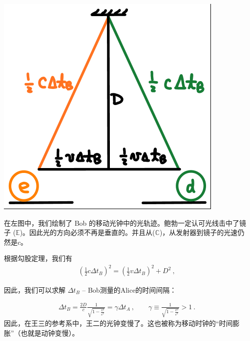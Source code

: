 {	\begin{minipage}
		{0.35\textwidth}
		\includegraphics[width=\textwidth, trim={0 2pt 2pt 0}, clip]{light_clock_B1}
	\end{minipage}
	\hspace{0.05\textwidth}
	\begin{minipage}
		{0.6\textwidth}
		在左图中，我们绘制了 Bob 的移动光钟中的光轨迹。鲍勃一定认可光线击中了镜子 ($\mathbb{E}$)。因此光的方向必须不再是垂直的。并且从($\mathbb{C}$)，从发射器到镜子的光速仍然是$c$。

		
		根据勾股定理，我们有
		\begin{align}
			\label{eq:lcb}
			\left ( \frac{1}{2} c \Delta t_B \right )^2 = \left ( \frac{1}{2} v \Delta t_B \right )^2 + D^2 ~,
		\end{align}
	\end{minipage}

	\bigskip

	\tcblower
	
	因此，我们可以求解 $\Delta t_B$ -- Bob测量的Alice的时间间隔：

	\begin{align}
		\label{eq:dtb}
		\Delta t_B = \frac{2D}{c} \frac{1}{\sqrt{1-\frac{v^2}{c^2} }} = \gamma \Delta t_A ~,
		\qquad
		\gamma \equiv \frac{1}{\sqrt{1-\frac{v^2}{c^2} }} > 1~.
	\end{align}
	因此，在王三的参考系中，王二的光钟变慢了。这也被称为移动时钟的“时间膨胀”（也就是动钟变慢）。
}

